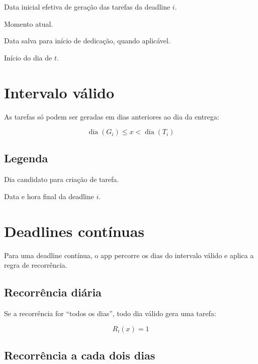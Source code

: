 \documentclass[12pt,a4paper]{article}
\begin{document}
\begin{description}[leftmargin=2.2cm]
    \item[$G_i$] Data inicial efetiva de geração das tarefas da deadline $i$.
    \item[$t$] Momento atual.
    \item[$S_i$] Data salva para início de dedicação, quando aplicável.
    \item[$\operatorname{dia}(t)$] Início do dia de $t$.
\end{description}

\section{Intervalo válido}

As tarefas só podem ser geradas em dias anteriores ao dia da entrega:

\[
\operatorname{dia}(G_i) \leq x < \operatorname{dia}(T_i)
\]

\subsection*{Legenda}

\begin{description}[leftmargin=2.2cm]
    \item[$x$] Dia candidato para criação de tarefa.
    \item[$T_i$] Data e hora final da deadline $i$.
\end{description}

\section{Deadlines contínuas}

Para uma deadline contínua, o app percorre os dias do intervalo válido e aplica a regra de recorrência.

\subsection{Recorrência diária}

Se a recorrência for ``todos os dias'', todo dia válido gera uma tarefa:

\[
R_i(x) = 1
\]

\subsection{Recorrência a cada dois dias}
\end{document}
